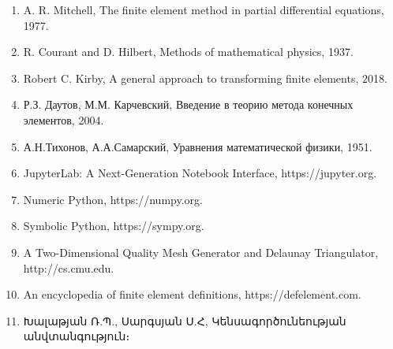 \documentclass[fleqn, bachelor,subf,12pt,notitlepage]{article}
\begin{document}
\begin{enumerate}[leftmargin=-1.0cm]

\item{{A. R. Mitchell}, The finite element method in partial differential equations, 1977.}
\item{{R. Courant and D. Hilbert}, Methods of mathematical physics, 1937.}
\item{{Robert C. Kirby}, A general approach to transforming finite elements, 2018.}
\item{{Р.З. Даутов, М.М. Карчевский}, Введение в теорию метода конечных элементов, 2004.}
\item{{А.Н.Тихонов, А.А.Самарский}, Уравнения математической физики, 1951.}
\item{{JupyterLab: A Next-Generation Notebook Interface}, https://jupyter.org.}
\item{{Numeric Python}, https://numpy.org.}
\item{{Symbolic Python}, https://sympy.org.}
\item{{A Two-Dimensional Quality Mesh Generator and Delaunay Triangulator}, http://cs.cmu.edu.}
\item{{An encyclopedia of finite element definitions}, https://defelement.com.}
\item{{Խալաթյան Ռ.Պ., Սարգսյան Ս.Հ}, Կենսագործունեության անվտանգություն։}

\end{enumerate}
\end{document}
